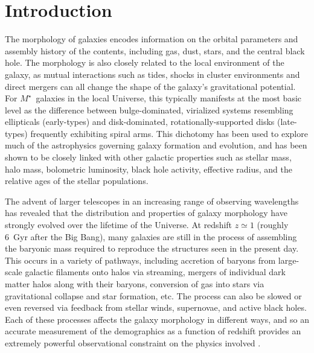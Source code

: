 \documentclass[twocolumn]{aastex6}
\begin{document}

\section{Introduction} \label{sec:intro}

The morphology of galaxies encodes information on the orbital parameters and assembly history of the contents, including gas, dust, stars, and the central black hole. The morphology is also closely related to the local environment of the galaxy, as mutual interactions such as tides, shocks in cluster environments and direct mergers can all change the shape of the galaxy's gravitational potential. For $M^\star$~galaxies in the local Universe, this typically manifests at the most basic level as the difference between bulge-dominated, virialized systems resembling ellipticals (early-types) and disk-dominated, rotationally-supported disks (late-types) frequently exhibiting spiral arms. This dichotomy has been used to explore much of the astrophysics governing galaxy formation and evolution, and has been shown to be closely linked with other galactic properties such as stellar mass, halo mass, bolometric luminosity, black hole activity, effective radius, and the relative ages of the stellar populations. 

The advent of larger telescopes in an increasing range of observing wavelengths has revealed that the distribution and properties of galaxy morphology have strongly evolved over the lifetime of the Universe. At redshift $z\simeq1$ (roughly 6~Gyr after the Big Bang), many galaxies are still in the process of assembling the baryonic mass required to reproduce the structures seen in the present day. This occurs in a variety of pathways, including accretion of baryons from large-scale galactic filaments onto halos via streaming, mergers of individual dark matter halos along with their baryons, conversion of gas into stars via gravitational collapse and star formation, etc. The process can also be slowed or even reversed via feedback from stellar winds, supernovae, and active black holes. Each of these processes affects the galaxy morphology in different ways, and so an accurate measurement of the demographics as a function of redshift provides an extremely powerful observational constraint on the physics involved \citep[for a recent review see][]{con14}. 
\end{document}
